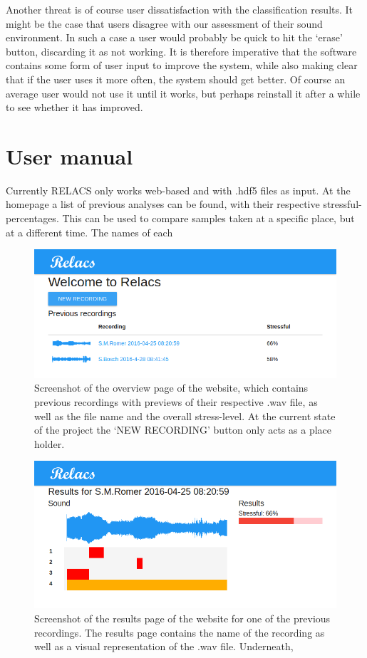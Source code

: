\documentclass[a4paper]{article}
\begin{document}
Another threat is of course user dissatisfaction with the classification results. It might be the case that users disagree with our assessment of their sound environment. In such a case a user would probably be quick to hit the `erase' button, discarding it as not working. It is therefore imperative that the software contains some form of user input to improve the system, while also making clear that if the user uses it more often, the system should get better. Of course an average user would not use it until it works, but perhaps reinstall it after a while to see whether it has improved.

\section{User manual}
Currently RELACS only works web-based and with .hdf5 files as input. At the homepage a list of previous analyses can be found, with their respective stressful-percentages. This can be used to compare samples taken at a specific place, but at a different time. The names of each 

\begin{figure}[h]
\centering
\includegraphics[width=0.9\linewidth]{./Website}
\caption{Screenshot of the overview page of the website, which contains previous recordings with previews of their respective .wav file, as well as the file name and the overall stress-level. At the current state of the project the `NEW RECORDING' button only acts as a place holder.}
\label{fig:Website}
\end{figure}

\begin{figure}[h]
\centering
\includegraphics[width=0.9\linewidth]{./Audio1Results}
\caption{Screenshot of the results page of the website for one of the previous recordings. The results page contains the name of the recording as well as a visual representation of the .wav file. Underneath,  }
\label{fig:Audio1}
\end{figure}
\end{document}

